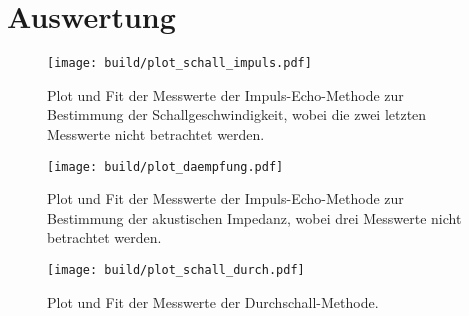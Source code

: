 \section{Auswertung}
\label{sec:Auswertung}




\begin{figure}
    \centering
    \texttt{[image: build/plot\_schall\_impuls.pdf]}
    \caption{Plot und Fit der Messwerte der Impuls-Echo-Methode zur Bestimmung der Schallgeschwindigkeit, wobei die zwei letzten Messwerte nicht betrachtet werden.}
    \label{fig:plot_schall_impuls}
\end{figure}


\begin{figure}
    \centering
    \texttt{[image: build/plot\_daempfung.pdf]}
    \caption{Plot und Fit der Messwerte der Impuls-Echo-Methode zur Bestimmung der akustischen Impedanz, wobei drei Messwerte nicht betrachtet werden.}
    \label{fig:plot_daempfung}
\end{figure}







\begin{figure}
    \centering
    \texttt{[image: build/plot\_schall\_durch.pdf]}
    \caption{Plot und Fit der Messwerte der Durchschall-Methode.}
    \label{fig:plot_schall_durch}
\end{figure}

